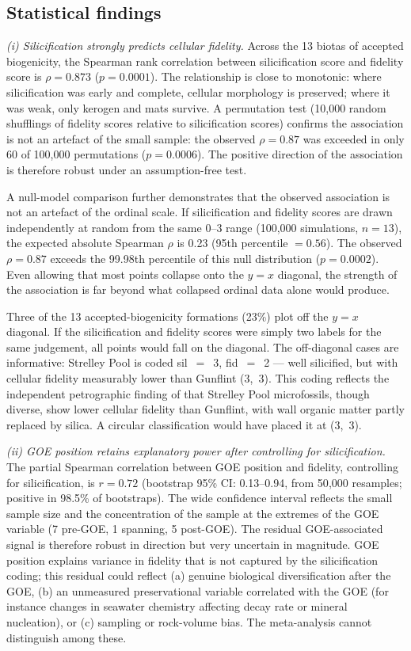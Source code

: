 \documentclass[11pt]{article}
\begin{document}
\subsection{Statistical findings}

\textit{(i) Silicification strongly predicts cellular fidelity.} Across the 13 biotas of accepted
biogenicity, the Spearman rank correlation between silicification score and fidelity score is
$\rho = 0.873$ ($p = 0.0001$). The relationship is close to monotonic: where silicification was
early and complete, cellular morphology is preserved; where it was weak, only kerogen and mats
survive. A permutation test (10{,}000 random shufflings of fidelity scores relative to silicification
scores) confirms the association is not an artefact of the small sample: the observed $\rho = 0.87$
was exceeded in only 60 of 100{,}000 permutations ($p = 0.0006$). The positive direction of the
association is therefore robust under an assumption-free test.

A null-model comparison further demonstrates that the observed association is not an artefact of the
ordinal scale. If silicification and fidelity scores are drawn independently at random from the same
0--3 range (100{,}000 simulations, $n = 13$), the expected absolute Spearman $\rho$ is 0.23 (95th
percentile $= 0.56$). The observed $\rho = 0.87$ exceeds the 99.98th percentile of this null
distribution ($p = 0.0002$). Even allowing that most points collapse onto the $y = x$ diagonal, the
strength of the association is far beyond what collapsed ordinal data alone would produce.

Three of the 13 accepted-biogenicity formations (23\%) plot off the $y = x$ diagonal. If the
silicification and fidelity scores were simply two labels for the same judgement, all points would
fall on the diagonal. The off-diagonal cases are informative: Strelley Pool is coded sil~$=$~3,
fid~$=$~2 --- well silicified, but with cellular fidelity measurably lower than Gunflint (3,~3). This
coding reflects the independent petrographic finding of \citet{Wacey2012} that Strelley Pool
microfossils, though diverse, show lower cellular fidelity than Gunflint, with wall organic matter
partly replaced by silica. A circular classification would have placed it at (3,~3).

\textit{(ii) GOE position retains explanatory power after controlling for silicification.} The
partial Spearman correlation between GOE position and fidelity, controlling for silicification, is
$r = 0.72$ (bootstrap 95\% CI: 0.13--0.94, from 50{,}000 resamples; positive in 98.5\% of
bootstraps). The wide confidence interval reflects the small sample size and the concentration of the
sample at the extremes of the GOE variable (7 pre-GOE, 1 spanning, 5 post-GOE). The residual
GOE-associated signal is therefore robust in direction but very uncertain in magnitude. GOE position
explains variance in fidelity that is not captured by the silicification coding; this residual could
reflect (a) genuine biological diversification after the GOE, (b) an unmeasured preservational
variable correlated with the GOE (for instance changes in seawater chemistry affecting decay rate or
mineral nucleation), or (c) sampling or rock-volume bias. The meta-analysis cannot distinguish among
these.
\end{document}
